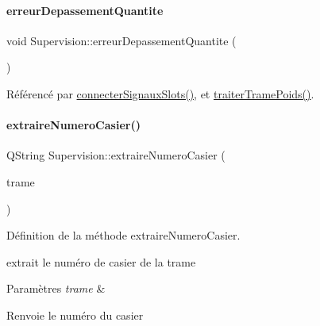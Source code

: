 \mbox{\label{class_supervision_a3fb19a3c16324a21af956fd272ca469d}} 
\paragraph{\texorpdfstring{erreur\+Depassement\+Quantite}{erreurDepassementQuantite}}
{\footnotesize\ttfamily void Supervision\+::erreur\+Depassement\+Quantite (\begin{DoxyParamCaption}{ }\end{DoxyParamCaption})\hspace{0.3cm}{\ttfamily [signal]}}



Référencé par \hyperlink{_supervision_8cpp_source_l00273}{connecter\+Signaux\+Slots()}, et \hyperlink{_supervision_8cpp_source_l00370}{traiter\+Trame\+Poids()}.

\mbox{\label{class_supervision_a141a35024b0cb74636a8c6810a1ab26d}} 
\paragraph{\texorpdfstring{extraire\+Numero\+Casier()}{extraireNumeroCasier()}}
{\footnotesize\ttfamily Q\+String Supervision\+::extraire\+Numero\+Casier (\begin{DoxyParamCaption}\item[{Q\+String}]{trame }\end{DoxyParamCaption})\hspace{0.3cm}{\ttfamily [private]}}



Définition de la méthode extraire\+Numero\+Casier. 

extrait le numéro de casier de la trame 
\begin{DoxyParams}{Paramètres}
{\em trame} & \\
\hline
\end{DoxyParams}
\begin{DoxyReturn}{Renvoie}
le numéro du casier 
\end{DoxyReturn}


